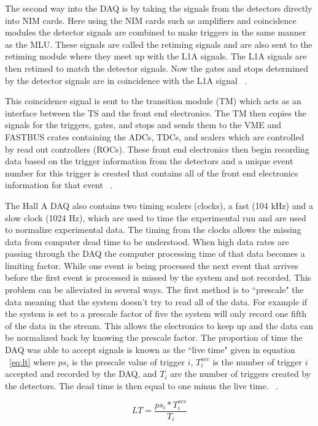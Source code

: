 The second way into the DAQ is by taking the signals from the detectors directly into NIM cards. Here using the NIM cards such as amplifiers and coincidence modules the detector signals are combined to make triggers in the same manner as the MLU. These signals are called the retiming signals and are also sent to the retiming module where they meet up with the L1A signals. The L1A signals are then retimed to match the detector signals. Now the gates and stops determined by the detector signals are in coincidence with the L1A signal ~\cite{DAQ}.

This coincidence signal is sent to the transition module (TM) which acts as an interface between the TS and the front end electronics. The TM then copies the signals for the triggers, gates, and stops and sends them to the VME and FASTBUS crates containing the ADCs, TDCs, and scalers which are controlled by read out controllers (ROCs). These front end electronics then begin recording data based on the trigger information from the detectors and a unique event number for this trigger is created that contains all of the front end electronics information for that event ~\cite{DAQ}.

The Hall A DAQ also contains two timing scalers (clocks), a fast (104 kHz) and a slow clock (1024 Hz), which are used to time the experimental run and are used to normalize experimental data. The timing from the clocks allows the missing data from computer dead time to be understood. When high data rates are passing through the DAQ the computer processing time of that data becomes a limiting factor. While one event is being processed the next event that arrives before the first event is processed is missed by the system and not recorded. This problem can be alleviated in several ways. The first method is to ``prescale" the data meaning that the system doesn't try to read all of the data. For example if the system is set to a prescale factor of five the system will only record one fifth of the data in the stream. This allows the electronics to keep up and the data can be normalized back by knowing the prescale factor. The proportion of time the DAQ was able to accept signals is known as the ``live time" given in equation ~\ref{eq:lt} where $ps_i$ is the prescale value of trigger $i$, $T_i^{acc}$ is the number of trigger $i$ accepted and recorded by the DAQ, and $T_i$ are the number of triggers created by the detectors. The dead time is then equal to one minus the live time. ~\cite{DAQ}. 

\begin{equation} \label{eq:lt}
	LT = \frac{ps_i * T_i^{acc}}{T_i}
\end{equation}

